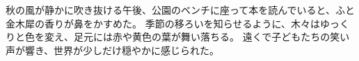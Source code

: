 \documentclass[a4paper]{jarticle}
\begin{document}
秋の風が静かに吹き抜ける午後、公園のベンチに座って本を読んでいると、ふと金木犀の香りが鼻をかすめた。
季節の移ろいを知らせるように、木々はゆっくりと色を変え、足元には赤や黄色の葉が舞い落ちる。
遠くで子どもたちの笑い声が響き、世界が少しだけ穏やかに感じられた。
\end{document}
